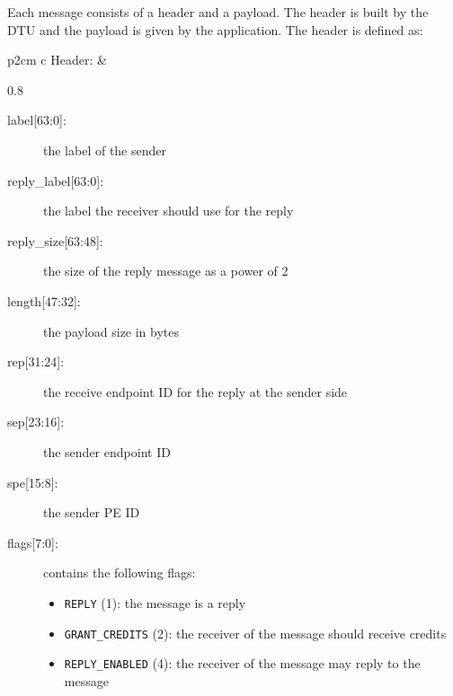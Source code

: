 \documentclass[a4paper,11pt,draft]{article}
\makeatletter
\def\tikzscale{1}\begin{lrbox}{\measure@tikzpicture}%
\edef\tikzscale{\pgfmathresult}%
\makeatother
\begin{document}
Each message consists of a header and a payload. The header is built by the DTU and the payload is
given by the application. The header is defined as:

\vspace{2ex}
\noindent
\begin{tabular}{ p{2cm} c }
  Header: &
  \begin{scaletikzpicturetowidth}{0.8\linewidth}
  \end{scaletikzpicturetowidth}
\end{tabular}
\vspace{2ex}

\begin{description}
  \item[label{[63:0]}:] the label of the sender
  \item[reply\_label{[63:0]}:] the label the receiver should use for the reply
  \item[reply\_size{[63:48]}:] the size of the reply message as a power of 2
  \item[length{[47:32]}:] the payload size in bytes
  \item[rep{[31:24]}:] the receive endpoint ID for the reply at the sender side
  \item[sep{[23:16]}:] the sender endpoint ID
  \item[spe{[15:8]}:] the sender PE ID
  \item[flags{[7:0]}:] contains the following flags:
  \begin{itemize}
    \item \texttt{REPLY} (1): the message is a reply
    \item \texttt{GRANT\_CREDITS} (2): the receiver of the message should receive credits
    \item \texttt{REPLY\_ENABLED} (4): the receiver of the message may reply to the message
  \end{itemize}
\end{description}
\end{document}
